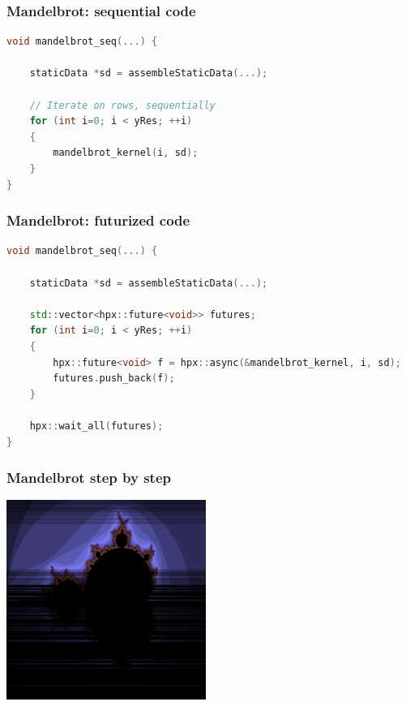 \documentclass[compress]{beamer}
\begin{document}
\begin{frame}[fragile]
	\frametitle{Mandelbrot: sequential code}
\begin{lstlisting}[language=C]
void mandelbrot_seq(...) {

	staticData *sd = assembleStaticData(...);

	// Iterate on rows, sequentially
	for (int i=0; i < yRes; ++i)
	{
		mandelbrot_kernel(i, sd);
	}
}
\end{lstlisting}
\end{frame}

\begin{frame}[fragile]
	\frametitle{Mandelbrot: futurized code}
	\begin{lstlisting}[language=C++]
void mandelbrot_seq(...) {

	staticData *sd = assembleStaticData(...);

	std::vector<hpx::future<void>> futures;
	for (int i=0; i < yRes; ++i)
	{
		hpx::future<void> f = hpx::async(&mandelbrot_kernel, i, sd);
		futures.push_back(f);
	}

	hpx::wait_all(futures);
}
\end{lstlisting}
\end{frame}

\begin{frame}
	\frametitle{Mandelbrot step by step}
	\begin{center}
		\includegraphics[width=65mm]{Figures/mandelbrot_partial.png}
	\end{center}
\end{frame}
\end{document}
